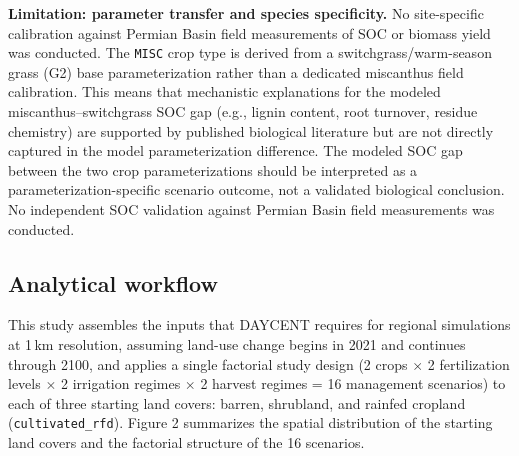 \documentclass[11pt]{article}
\begin{document}
\textbf{Limitation: parameter transfer and species specificity.}
No site-specific calibration against Permian Basin field measurements of SOC or biomass yield was conducted. The \texttt{MISC} crop type is derived from a switchgrass/warm-season grass (G2) base parameterization rather than a dedicated miscanthus field calibration. This means that mechanistic explanations for the modeled miscanthus--switchgrass SOC gap (e.g., lignin content, root turnover, residue chemistry) are supported by published biological literature but are not directly captured in the model parameterization difference. The modeled SOC gap between the two crop parameterizations should be interpreted as a parameterization-specific scenario outcome, not a validated biological conclusion. No independent SOC validation against Permian Basin field measurements was conducted.

\subsection*{Analytical workflow}

This study assembles the inputs that DAYCENT requires for regional simulations at 1\,km resolution, assuming land-use change begins in 2021 and continues through 2100, and applies a single factorial study design (2 crops $\times$ 2 fertilization levels $\times$ 2 irrigation regimes $\times$ 2 harvest regimes = 16 management scenarios) to each of three starting land covers: barren, shrubland, and rainfed cropland (\texttt{cultivated\_rfd}). Figure 2 summarizes the spatial distribution of the starting land covers and the factorial structure of the 16 scenarios.
\end{document}
